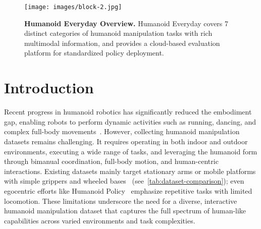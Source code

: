 \documentclass[letterpaper, 10pt, conference]{ieeeconf}
\begin{document}

\begin{figure*}[t]
  \centering
  \texttt{[image: images/block-2.jpg]}
  \caption{\textbf{Humanoid Everyday Overview.} Humanoid Everyday covers 7 distinct categories of humanoid manipulation tasks with rich multimodal information, and provides a cloud-based evaluation platform for standardized policy deployment.}
  \label{fig:block}
\end{figure*}
\section{Introduction}



Recent progress in humanoid robotics has significantly reduced the embodiment gap, enabling robots to perform dynamic activities such as running, dancing, and complex full-body movements~\cite{ji2024exbody2, cheng2024expressive, xue2025unified, mao2024learning}. However, collecting humanoid manipulation datasets remains challenging. It requires operating in both indoor and outdoor environments, executing a wide range of tasks, and leveraging the humanoid form through bimanual coordination, full-body motion, and human-centric interactions. Existing datasets mainly target stationary arms or mobile platforms with simple grippers and wheeled bases~\cite{o2024open, fang2023rh20t, walke2023bridgedata, fourier2025actionnet, bu2025agibot} (see~\autoref{tab:dataset-comparison}); even egocentric efforts like Humanoid Policy~\cite{qiu2025-humanpolicy} emphasize repetitive tasks with limited locomotion. These limitations underscore the need for a diverse, interactive humanoid manipulation dataset that captures the full spectrum of human-like capabilities across varied environments and task complexities.\par
\end{document}
